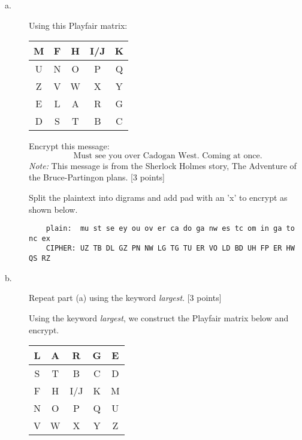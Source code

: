\documentclass[../hw_sols.tex]{subfiles}
\begin{document}
\begin{description}

\item[a.] Using this Playfair matrix:
	\begin{center}
	\begin{tabular}{ | c | c | c | c | c | }
		\hline
		M & F & H & I/J & K \\
		\hline
		U & N & O &   P & Q \\
		\hline
		Z & V & W &   X & Y \\
		\hline
		E & L & A &   R & G \\
		\hline
		D & S & T &   B & C \\
		\hline
	\end{tabular}
	\end{center}

\noindent Encrypt this message:
	$$\text{Must see you over Cadogan West. Coming at once.}$$
\textit{Note:} This message is from the Sherlock Holmes story, The 
Adventure of the Bruce-Partingon plans. [3 points]

\begin{solution}
Split the plaintext into digrams and add pad with an 'x' to encrypt as shown 
below.
\begin{verbatim}
    plain:  mu st se ey ou ov er ca do ga nw es tc om in ga to nc ex
    CIPHER: UZ TB DL GZ PN NW LG TG TU ER VO LD BD UH FP ER HW QS RZ
\end{verbatim}
\end{solution}


\item[b.] Repeat part (a) using the keyword \textit{largest}. [3 points]

\begin{solution}

Using the keyword \textit{largest}, we construct the Playfair matrix below 
and encrypt.
	\begin{center}
	\begin{tabular}{ | c | c | c | c | c | }
		\hline \rowcolor{cyan!40}
		L & A & R & G & E \\
		\hline
		S \cellcolor{cyan!40} & T \cellcolor{cyan!40} & B & C & D\\
		\hline
		F & H & I/J & K & M\\
		\hline
		N & O &   P & Q & U\\
		\hline
		V & W &   X & Y & Z\\
		\hline
	\end{tabular}
	\end{center}


\end{solution}
\end{description}
\end{document}
